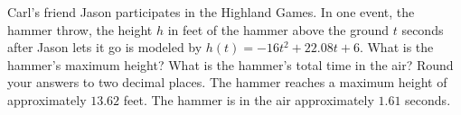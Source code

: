 {Carl's friend Jason participates in the Highland Games. In one event, the hammer throw, the height $h$ in feet of the hammer above the ground $t$ seconds after Jason lets it go is modeled by $h(t) = -16t^2 +  22.08t + 6$.  What is the hammer's maximum height?  What is the hammer's total time in the air? Round your answers to two decimal places.}
{The hammer reaches a maximum height of approximately $13.62$ feet.  The hammer is in the air approximately $1.61$ seconds.}
